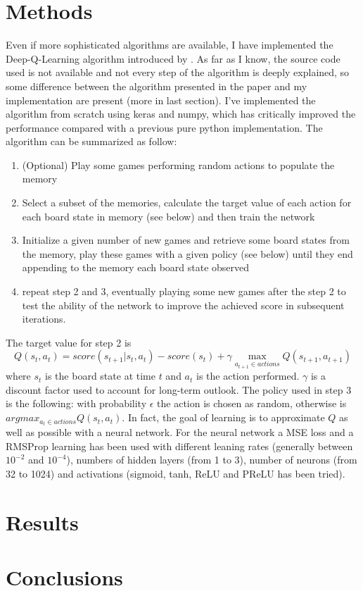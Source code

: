 \documentclass[]{article}
\begin{document}
\section{Methods}
Even if more sophisticated algorithms are available, I have implemented the Deep-Q-Learning algorithm introduced by \textcite{Mnih2015}.
As far as I know, the source code used is not available and not every step of the algorithm is deeply explained, so some difference between the algorithm presented in the paper and my implementation are present (more in last section).
I've implemented the algorithm from scratch using keras and numpy, which has critically improved the performance compared with a previous pure python implementation. 
The algorithm can be summarized as follow:
\begin{enumerate}
	\item (Optional) Play some games performing random actions to populate the memory
	\item Select a subset of the memories, calculate the target value of each action for each board state in memory (see below) and then train the network
	\item Initialize a given number of new games and retrieve some board states from the memory, play these games with a given policy (see below) until they end appending to the memory each board state observed
	\item repeat step 2 and 3, eventually playing some new games after the step 2 to test the ability of the network to improve the achieved score in subsequent iterations.
\end{enumerate}
The target value for step 2 is
$$Q(s_t, a_t) = score(s_{t+1} | s_t, a_t) - score(s_t) + \gamma \max_{a_{t+1} \in actions} Q(s_{t+1}, a_{t+1})$$
where $s_t$ is the board state at time $t$ and $a_t$ is the action performed. $\gamma$ is a discount factor used to account for long-term outlook. 
The policy used in step 3 is the following: with probability $\epsilon$ the action is chosen as random, otherwise is $argmax_{a_t \in actions} Q(s_t, a_t)$.
In fact, the goal of learning is to approximate $Q$ as well as possible with a neural network.
For the neural network a MSE loss and a RMSProp learning has been used with different leaning rates (generally between $10^{-2}$ and $10^{-4}$), numbers of hidden layers (from 1 to 3), number of neurons (from 32 to 1024) and activations (sigmoid, tanh, ReLU and PReLU has been tried).

\section{Results}


\section{Conclusions}

\printbibliography{}
\end{document}
